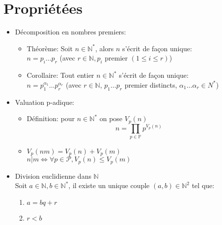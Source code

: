 \documentclass[fleqn]{article}
\begin{document}
\section{Propri\'et\'ees}
\begin{itemize}
	\item D\'ecomposition en nombres premiers:
		\begin{itemize}
			\item Th\'eor\`eme: Soit $n \in \mathbb{N}^*$, alors $n$ s'\'ecrit de fa\c{c}on unique: \\
				$n = p_i \ldots p_r$ (avec $r \in \mathbb{N}, p_i$ premier $(1 \leq i \leq r)$)
			\item Corollaire: Tout entier $n \in \mathbb{N}^*$ s'\'ecrit de fa\c{c}on unique: \\
				$n = p_1^{\alpha_1} \ldots p_r^{\alpha_r}$ (avec $r \in \mathbb{N}$,
				$p_1 \ldots p_r$ premier distincts, $\alpha_1 \ldots \alpha_r \in {N}^*$)
		\end{itemize}
	\item Valuation p-adique:
		\begin{itemize}
			\item D\'efinition: pour $n \in \mathbb{N}^*$ on pose $V_p(n)$ \\
				\[n = \prod_{p \in \mathbb{P}} p^{V_p(n)}\]
			\item $V_p(nm) = V_p(n) + V_p(m)$ \\
				$n|m \Leftrightarrow \forall p \in \mathcal{P}, V_p(n) \leq V_p(m)$
		\end{itemize}
	\item Division euclidienne dans $\mathbb{N}$ \\
		Soit $a \in \mathbb{N}, b \in \mathbb{N}^*$, il existe un unique couple $(a,b) \in \mathbb{N}^2$ tel que:
		\begin{enumerate}
			\item $a = bq + r$
			\item $r < b$
		\end{enumerate}
\end{itemize}
\end{document}
